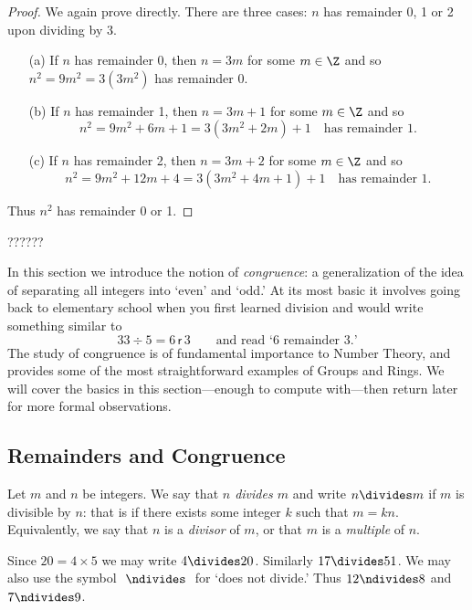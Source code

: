 \begin{proof}
We again prove directly. There are three cases: $n$ has remainder 0, 1 or 2 upon dividing by 3.
\begin{enumerate}
  \item[(a)] If $n$ has remainder 0, then $n=3m$ for some $m\in\Z$ and so $n^2=9m^2=3(3m^2)$ has remainder 0.
  \item[(b)] If $n$ has remainder 1, then $n=3m+1$ for some $m\in\Z$ and so
  \[n^2=9m^2+6m+1=3(3m^2+2m)+1\quad\text{has remainder 1.}\]
  \item[(c)] If $n$ has remainder 2, then $n=3m+2$ for some $m\in\Z$ and so
  \[n^2=9m^2+12m+4=3(3m^2+4m+1)+1\quad\text{has remainder 1.}\]
\end{enumerate}
Thus $n^2$ has remainder 0 or 1.
\end{proof}

??????

In this section we introduce the notion of \emph{congruence}: a generalization of the idea of separating all integers into `even' and `odd.' At its most basic it involves going back to elementary school when you first learned division and would write something similar to
\[33\div 5=6\mathsf{\,r\,}3\qquad\text{and read `6 remainder 3.'}\]
The study of congruence is of fundamental importance to Number Theory, and provides some of the most straightforward examples of Groups and Rings. We will cover the basics in this section---enough to compute with---then return later for more formal observations.

\subsection{Remainders and Congruence}\label{sec:cong}

\begin{defn}\label{defn:div}
Let $m$ and $n$ be integers. We say that \emph{$n$ divides $m$} and write $n\divides m$ if $m$ is divisible by $n$: that is if there exists some integer $k$ such that $m=kn$. Equivalently, we say that $n$ is a \emph{divisor} of $m$, or that $m$ is a \emph{multiple} of $n$.
\end{defn}

\begin{exs}
Since $20=4\times 5$ we may write $4\divides 20$. Similarly $17\divides 51$. We may also use the symbol $\ \ndivides\ $ for `does not divide.' Thus $12\ndivides 8$ and $7\ndivides 9$.
\end{exs}

